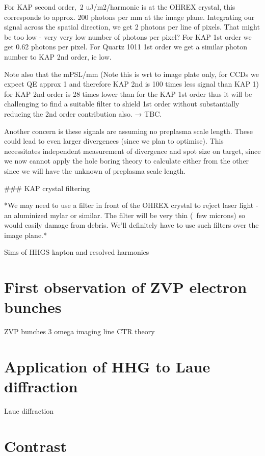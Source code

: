 For KAP second order, 2 uJ/m2/harmonic is at the OHREX crystal, this corresponds to approx. 200 photons per mm at the image plane. Integrating our signal across the spatial direction, we get 2 photons per line of pixels. That might be too low - very very low number of photons per pixel? For KAP 1st order we get 0.62 photons per pixel. For Quartz 1011 1st order we get a similar photon number to KAP 2nd order, ie low.

Note also that the mPSL/mm (Note this is wrt to image plate only, for CCDs we expect QE approx 1 and therefore KAP 2nd is 100 times less signal than KAP 1) for KAP 2nd order is 28 times lower than for the KAP 1st order thus it will be challenging to find a suitable filter to shield 1st order without substantially reducing the 2nd order contribution also. → TBC.

Another concern is these signals are assuming no preplasma scale length. These could lead to even larger divergences (since we plan to optimise). This necessitates independent measurement of divergence and spot size on target, since we now cannot apply the hole boring theory to calculate either from the other since we will have the unknown of preplasma scale length.

### KAP crystal filtering

*We may need to use a filter in front of the OHREX crystal to reject laser light - an aluminized mylar or similar. The filter will be very thin (~few microns) so would easily damage from debris. We’ll definitely have to use such filters over the image plane.*




Sims of HHGS kapton and resolved harmonics



\section{First observation of ZVP electron bunches}



ZVP bunches 
3 omega imaging line
CTR theory


\section{Application of HHG to Laue diffraction}
Laue diffraction



\section{Contrast}

